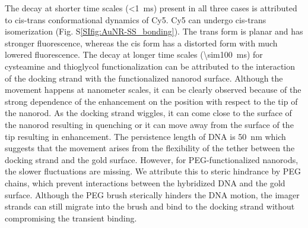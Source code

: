 The decay at shorter time scales (\SI{<1}{\ms}) present in all three cases is attributed to cis-trans conformational dynamics of Cy5.\cite{yeh2008tunable}
Cy5 can undergo cis-trans isomerization (Fig. S\ref{SIfig:AuNR-SS_bonding}). The trans form is planar and has stronger fluorescence, whereas the cis form has a distorted form with much lowered fluorescence.
The decay at longer time scales (\SI{\sim100}{\ms}) for cysteamine and thioglycol functionalization can be attributed to the interaction of the docking strand with the functionalized nanorod surface.
Although the movement happens at nanometer scales, it can be clearly observed because of the strong dependence of the enhancement on the position with respect to the tip of the nanorod.
As the docking strand wiggles, it can come close to the surface of the nanorod resulting in quenching or it can move away from the surface of the tip resulting in enhancement.
The persistence length of DNA\cite{manning2006the} is \SI{50}{\nm} which suggests that the movement arises from the flexibility of the tether between the docking strand and the gold surface.
However, for PEG-functionalized nanorods, the slower fluctuations are missing. We attribute this to steric hindrance by PEG chains, which prevent interactions between the hybridized DNA and the gold surface. Although the PEG brush sterically hinders the DNA motion, the imager strands can still migrate into the brush and bind to the docking strand without compromising the transient binding.


